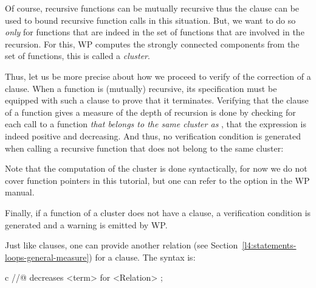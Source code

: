 

Of course, recursive functions can be mutually recursive thus the
 clause can be used to bound recursive function calls in
this situation. But, we want to do so {\em only} for functions that are
indeed in the set of functions that are involved in the recursion. For this, WP
computes the strongly connected components from the set of functions, this is
called a {\em cluster}.

Thus, let us be more precise about how we proceed to verify of the
correction of a  clause. When a function is (mutually)
recursive, its specification must be equipped with such a clause to prove that
it terminates. Verifying that the  clause of a function
 gives a measure of the depth of recursion is done by checking for
each call to a function \emph{that belongs to the same cluster as
}, that the expression is indeed positive and decreasing. And
thus, no verification condition is generated when calling a recursive function
that does not belong to the same cluster:




\begin{Information}
  Note that the computation of the cluster is done syntactically, for now we do
  not cover function pointers in this tutorial, but one can refer to the option
   in the WP manual.
\end{Information}


Finally, if a function of a cluster does not have a 
clause, a  verification condition is generated
and a warning is emitted by WP.






\begin{Information}
  Just like  clauses, one can provide another relation
  (see Section~\ref{l4:statements-loops-general-measure}) for a
   clause. The syntax is:


  \begin{CodeBlock}{c}
//@ decreases <term> for <Relation> ;
\end{CodeBlock}
\end{Information}




